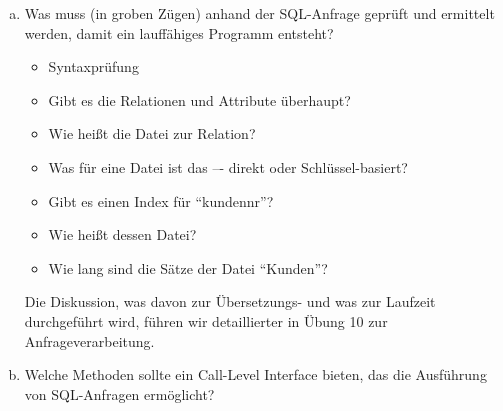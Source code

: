 \begin{enumerate}[a)]

	\item Was muss (in groben Zügen) anhand der SQL-Anfrage geprüft und ermittelt werden, damit ein lauffähiges Programm entsteht?

	\begin{solution}
	\begin{itemize}
		\item Syntaxprüfung
		\item Gibt es die Relationen und Attribute überhaupt?
		\item Wie heißt die Datei zur Relation?
		\item Was für eine Datei ist das –- direkt oder Schlüssel-basiert?
		\item Gibt es einen Index für "`kundennr"'?
		\item Wie heißt dessen Datei?
		\item Wie lang sind die Sätze der Datei "`Kunden"'?
	\end{itemize}
  Die Diskussion, was davon zur Übersetzungs- und was zur Laufzeit durchgeführt wird, führen wir detaillierter in Übung 10 zur Anfrageverarbeitung.
	\end{solution}

	\item Welche Methoden sollte ein Call-Level Interface bieten, das die Ausführung von SQL-Anfragen ermöglicht?


\end{enumerate}
